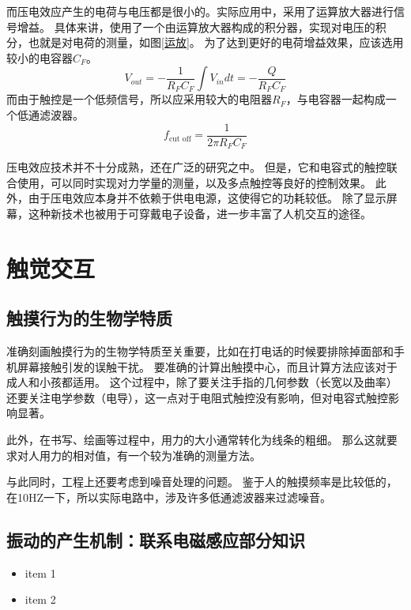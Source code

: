 \documentclass[UTF-8]{ctexart}
\begin{document}
而压电效应产生的电荷与电压都是很小的。实际应用中，采用了运算放大器进行信号增益。
具体来讲，使用了一个由运算放大器构成的积分器\cite{circuit}，实现对电压的积分，也就是对电荷的测量，如图\ref{运放}。
为了达到更好的电荷增益效果，应该选用较小的电容器$C_F$。
$$
V_{out}=-\frac{1}{R_FC_F}\int V_{in} dt=-\frac{Q}{R_FC_F}
$$
而由于触控是一个低频信号，所以应采用较大的电阻器$R_F$，与电容器一起构成一个低通滤波器。
$$
f_{\text{cut off}}=\frac{1}{2\pi R_FC_F}
$$

压电效应技术并不十分成熟，还在广泛的研究之中。
但是，它和电容式的触控联合使用，可以同时实现对力学量的测量，以及多点触控等良好的控制效果。
此外，由于压电效应本身并不依赖于供电电源，这使得它的功耗较低。
除了显示屏幕，这种新技术也被用于可穿戴电子设备，进一步丰富了人机交互的途径。


\section{触觉交互}
\subsection{触摸行为的生物学特质}
准确刻画触摸行为的生物学特质至关重要，比如在打电话的时候要排除掉面部和手机屏幕接触引发的误触干扰。
要准确的计算出触摸中心，而且计算方法应该对于成人和小孩都适用。
这个过程中，除了要关注手指的几何参数（长宽以及曲率）还要关注电学参数（电导），这一点对于电阻式触控没有影响，但对电容式触控影响显著。

此外，在书写、绘画等过程中，用力的大小通常转化为线条的粗细。
那么这就要求对人用力的相对值，有一个较为准确的测量方法。

与此同时，工程上还要考虑到噪音处理的问题。
鉴于人的触摸频率是比较低的，在10HZ一下，所以实际电路中，涉及许多低通滤波器来过滤噪音。

\subsection{振动的产生机制：联系电磁感应部分知识}








\begin{itemize}
    \item item 1
    \item item 2
\end{itemize}




\end{document}
